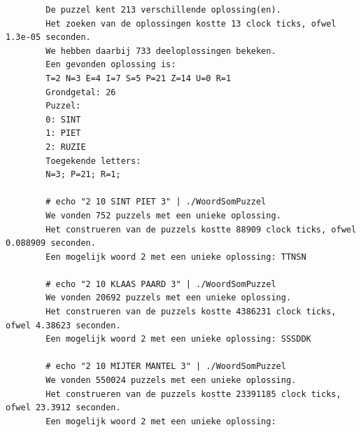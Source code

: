 \documentclass[twocolumn,10pt]{article}
\begin{document}
\begin{appendices}
\begin{lstlisting}
        De puzzel kent 213 verschillende oplossing(en).
        Het zoeken van de oplossingen kostte 13 clock ticks, ofwel 1.3e-05 seconden.
        We hebben daarbij 733 deeloplossingen bekeken.
        Een gevonden oplossing is:
        T=2 N=3 E=4 I=7 S=5 P=21 Z=14 U=0 R=1
        Grondgetal: 26 
        Puzzel:
        0: SINT
        1: PIET
        2: RUZIE
        Toegekende letters:
        N=3; P=21; R=1; 

        # echo "2 10 SINT PIET 3" | ./WoordSomPuzzel
        We vonden 752 puzzels met een unieke oplossing.
        Het construeren van de puzzels kostte 88909 clock ticks, ofwel 0.088909 seconden.
        Een mogelijk woord 2 met een unieke oplossing: TTNSN

        # echo "2 10 KLAAS PAARD 3" | ./WoordSomPuzzel
        We vonden 20692 puzzels met een unieke oplossing.
        Het construeren van de puzzels kostte 4386231 clock ticks, ofwel 4.38623 seconden.
        Een mogelijk woord 2 met een unieke oplossing: SSSDDK

        # echo "2 10 MIJTER MANTEL 3" | ./WoordSomPuzzel
        We vonden 550024 puzzels met een unieke oplossing.
        Het construeren van de puzzels kostte 23391185 clock ticks, ofwel 23.3912 seconden.
        Een mogelijk woord 2 met een unieke oplossing: 


        
    \end{lstlisting}
 
\end{appendices}
\end{document}
